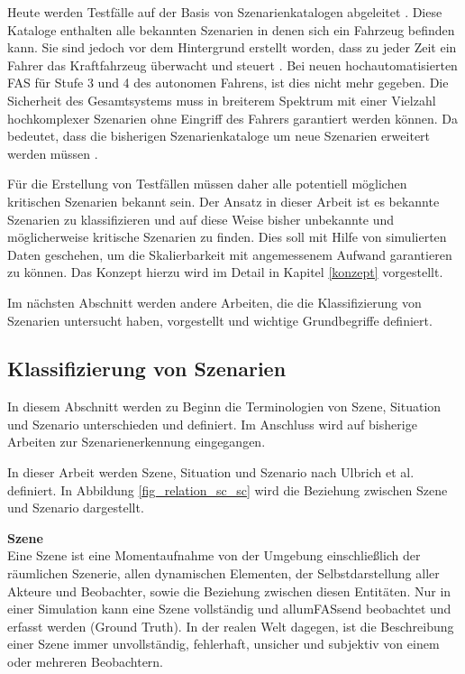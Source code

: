 Heute werden Testfälle auf der Basis von Szenarienkatalogen abgeleitet \cite{putz2017system}. Diese Kataloge enthalten alle bekannten Szenarien in denen sich ein Fahrzeug befinden kann. Sie sind jedoch vor dem Hintergrund erstellt worden, dass zu jeder Zeit ein Fahrer das Kraftfahrzeug überwacht und steuert \cite{wachenfeld2015freigabe}. Bei neuen hochautomatisierten \ac{FAS} für Stufe 3 und 4 des autonomen Fahrens, ist dies nicht mehr gegeben. Die Sicherheit des Gesamtsystems muss in breiterem Spektrum mit einer Vielzahl hochkomplexer Szenarien ohne Eingriff des Fahrers garantiert werden können. Da bedeutet, dass die bisherigen Szenarienkataloge um neue Szenarien erweitert werden müssen \cite{surmund2018neue}.

Für die Erstellung von Testfällen müssen daher alle potentiell möglichen kritischen Szenarien bekannt sein. Der Ansatz in dieser Arbeit ist es bekannte Szenarien zu klassifizieren und auf diese Weise bisher unbekannte und möglicherweise kritische Szenarien zu finden. Dies soll mit Hilfe von simulierten Daten geschehen, um die Skalierbarkeit mit angemessenem Aufwand garantieren zu können. Das Konzept hierzu wird im Detail in Kapitel \ref{konzept} vorgestellt.

 Im nächsten Abschnitt werden andere Arbeiten, die die Klassifizierung von Szenarien untersucht haben, vorgestellt und wichtige Grundbegriffe definiert.


\subsection{Klassifizierung von Szenarien}
\label{grundlagen_fahren_szenarien}

In diesem Abschnitt werden zu Beginn die Terminologien von Szene, Situation und Szenario unterschieden und definiert. Im Anschluss wird auf bisherige Arbeiten zur Szenarienerkennung eingegangen.

In dieser Arbeit werden Szene, Situation und Szenario nach Ulbrich et al. \cite{ulbrich2015defining} definiert. In Abbildung \ref{fig_relation_sc_sc} wird die Beziehung zwischen Szene und Szenario dargestellt.

\noindent\textbf{Szene}\\
Eine Szene ist eine Momentaufnahme von der Umgebung einschließlich der räumlichen Szenerie,  allen dynamischen Elementen, der Selbstdarstellung aller Akteure und Beobachter, sowie die Beziehung zwischen diesen Entitäten. Nur in einer Simulation kann eine Szene vollständig und allumFASsend beobachtet und erfasst werden (Ground Truth). In der realen Welt dagegen, ist die Beschreibung einer Szene immer unvollständig, fehlerhaft, unsicher und subjektiv von einem oder mehreren Beobachtern.

